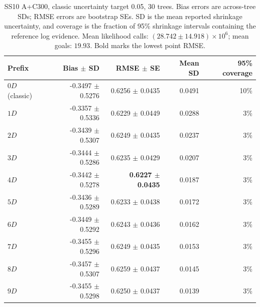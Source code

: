 \documentclass[pdflatex,sn-basic,icol]{sn-jnl}
\theoremstyle{plain}
\theoremstyle{definition}
\begin{document}
\begin{table}[t]
\centering
\scriptsize
\caption{SS10 A+C300, classic uncertainty target 0.05, 30 trees. Bias errors are across-tree SDs; RMSE errors are bootstrap SEs. SD is the mean reported shrinkage uncertainty, and coverage is the fraction of 95\% shrinkage intervals containing the reference log evidence. Mean likelihood calls: $(28.742\pm14.918)\times10^6$; mean goals: $19.93$. Bold marks the lowest point RMSE.}
\label{tab:phantom_evidence_ss10_0p05}
\begin{tabular}{lrrrr}
\toprule
Prefix & Bias $\pm$ SD & RMSE $\pm$ SE & Mean SD & 95\% coverage \\
\midrule
$0D$ (classic) & -0.3497 $\pm$ 0.5276 & 0.6256 $\pm$ 0.0435 & 0.0491 & 10\% \\
$1D$ & -0.3357 $\pm$ 0.5336 & 0.6229 $\pm$ 0.0449 & 0.0288 & 3\% \\
$2D$ & -0.3439 $\pm$ 0.5307 & 0.6249 $\pm$ 0.0435 & 0.0237 & 3\% \\
$3D$ & -0.3444 $\pm$ 0.5286 & 0.6235 $\pm$ 0.0429 & 0.0207 & 3\% \\
$4D$ & -0.3442 $\pm$ 0.5278 & \textbf{0.6227 $\pm$ 0.0435} & 0.0187 & 3\% \\
$5D$ & -0.3436 $\pm$ 0.5289 & 0.6233 $\pm$ 0.0438 & 0.0172 & 3\% \\
$6D$ & -0.3449 $\pm$ 0.5292 & 0.6243 $\pm$ 0.0436 & 0.0162 & 3\% \\
$7D$ & -0.3455 $\pm$ 0.5296 & 0.6249 $\pm$ 0.0435 & 0.0153 & 3\% \\
$8D$ & -0.3457 $\pm$ 0.5307 & 0.6259 $\pm$ 0.0437 & 0.0145 & 3\% \\
$9D$ & -0.3455 $\pm$ 0.5298 & 0.6250 $\pm$ 0.0437 & 0.0139 & 3\% \\
\bottomrule
\end{tabular}
\end{table}
\end{document}
